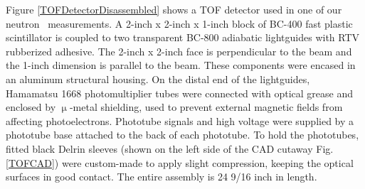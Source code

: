 Figure \ref{TOFDetectorDisassembled} shows a TOF detector used in one
of our neutron \tot\ measurements. A 2-inch x 2-inch x 1-inch block of BC-400 fast
plastic scintillator is coupled to two transparent
BC-800 adiabatic lightguides with RTV rubberized adhesive. The 2-inch x 2-inch face is perpendicular
to the beam and the 1-inch dimension is parallel to the beam. These components were encased
in an aluminum structural housing. On the distal end of the lightguides, Hamamatsu 1668
photomultiplier tubes were connected with optical grease and enclosed by
$\upmu$-metal shielding, used to prevent external magnetic fields from affecting photoelectrons.
Phototube signals and high voltage were supplied by a phototube base attached to the back of each
phototube. To hold the phototubes, fitted black Delrin sleeves (shown on the
left side of the CAD cutaway Fig. \ref{TOFCAD}) were custom-made to apply slight
compression, keeping the optical surfaces in good contact. The entire assembly
is 24 9/16 inch in length.

